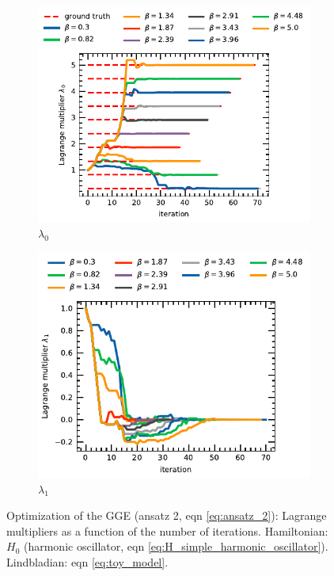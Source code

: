 \begin{figure}[t]
     \centering
     \begin{subfigure}[c]{0.45\textwidth}
         \centering
         \includegraphics[scale=0.9]{figs/opti_case_2_lagr_0.pdf}
         \caption{$\lambda_0$}
         \label{fig:opti_case_2_0}
     \end{subfigure}
     \hfill
     \begin{subfigure}[c]{0.45\textwidth}
         \centering
         \includegraphics[scale=0.9]{figs/opti_case_2_lagr_1.pdf}
         \caption{$\lambda_1$}
         \label{fig:opti_case_2_1}
     \end{subfigure}
        \caption{Optimization of the GGE (ansatz 2, eqn \ref{eq:ansatz_2}): Lagrange multipliers as a function of the number of iterations. Hamiltonian: $H_0$ (harmonic oscillator, eqn \ref{eq:H_simple_harmonic_oscillator}). Lindbladian: eqn \ref{eq:toy_model}.}
        \label{fig:opti_case_2_all}
\end{figure}
